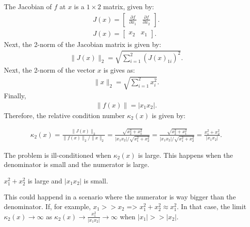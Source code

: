 \documentclass[11pt,onecolumn]{article}
\begin{document}
\begin{enumerate}
    The Jacobian of \( f \) at \( x \) is a \( 1 \times 2 \) matrix, given by:
    \begin{align}
        J(x) = \begin{bmatrix}
            \frac{\partial f}{\partial x_1} & \frac{\partial f}{\partial x_2}
        \end{bmatrix}.\\
        J(x) = \begin{bmatrix}
            x_2 & x_1
        \end{bmatrix}.
    \end{align}
    Next, the 2-norm of the Jacobian matrix is given by:
    \begin{align}
        \|J(x)\|_2 = \sqrt{\sum_{i=1}^2 (J(x)_{1i})^2}.
    \end{align}
    Next, the 2-norm of the vector $x$ is gives as:
    \begin{align}
        \|x\|_2 = \sqrt{\sum_{i=1}^2 x_i^2}.
    \end{align}
    Finally,
    \begin{align}
        \|f(x)\| = |x_1x_2|.
    \end{align}
    Therefore, the relative condition number \( \kappa_{2}(x) \) is given by:
    
    \begin{align}
        \kappa_{2}(x) = \frac{\|J(x)\|_{2}}{\|f(x)\|_{2}/\|x\|_{2}} = \frac{\sqrt{x_2^2 + x_1^2}}{|x_1x_2|/\sqrt{x_1^2 + x_2^2}} = \frac{\sqrt{x_2^2 + x_1^2}}{|x_1x_2|/\sqrt{x_1^2 + x_2^2}} = \frac{x_1^2 + x_2^2}{|x_1x_2|}.
    \end{align}

    The problem is ill-conditioned when \( \kappa_{2}(x) \) is large. This happens when the denominator is small and the numerator is large.

    \implies $x_1^2 + x_2^2$ is large and $|x_1x_2|$ is small.

    This could happend in a scenario where the numerator is way bigger than the denominator. If, for example, $x_1 >> x_2$ => $x_1^2 + x_2^2 \approx x_1^2$.
    In that case, the limit  $\kappa_{2}(x) \to \infty$ as $\kappa_{2}(x) \to \frac{x_1^2}{|x_1x_2|} \to \infty$ when $|x_1| >> |x_2|$.


\end{enumerate}

\end{document}

